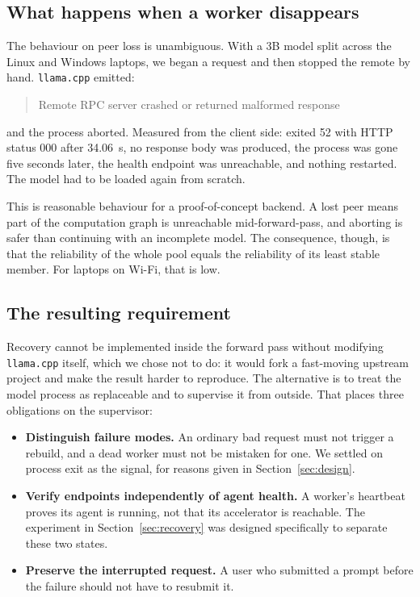 \subsection{What happens when a worker disappears}

The behaviour on peer loss is unambiguous. With a 3B model split across the
Linux and Windows laptops, we began a request and then stopped the remote
 by hand. \texttt{llama.cpp} emitted:

\begin{quote}\small\ttfamily
Remote RPC server crashed or returned malformed response
\end{quote}

\noindent
and the process aborted. Measured from the client side:  exited 52
with HTTP status 000 after \SI{34.06}{\second}, no response body was produced,
the process was gone five seconds later, the health endpoint was unreachable,
and nothing restarted. The model had to be loaded again from scratch.

This is reasonable behaviour for a proof-of-concept backend. A lost peer means
part of the computation graph is unreachable mid-forward-pass, and aborting is
safer than continuing with an incomplete model. The consequence, though, is that
the reliability of the whole pool equals the reliability of its least stable
member. For laptops on Wi-Fi, that is low.

\subsection{The resulting requirement}

Recovery cannot be implemented inside the forward pass without modifying
\texttt{llama.cpp} itself, which we chose not to do: it would fork a fast-moving
upstream project and make the result harder to reproduce. The alternative is to
treat the model process as replaceable and to supervise it from outside. That
places three obligations on the supervisor:

\begin{itemize}[leftmargin=1.4em,itemsep=2pt]
  \item \textbf{Distinguish failure modes.} An ordinary bad request must not
        trigger a rebuild, and a dead worker must not be mistaken for one. We
        settled on process exit as the signal, for reasons given in
        Section~\ref{sec:design}.
  \item \textbf{Verify endpoints independently of agent health.} A worker's
        heartbeat proves its agent is running, not that its accelerator is
        reachable. The experiment in Section~\ref{sec:recovery} was designed
        specifically to separate these two states.
  \item \textbf{Preserve the interrupted request.} A user who submitted a
        prompt before the failure should not have to resubmit it.
\end{itemize}
